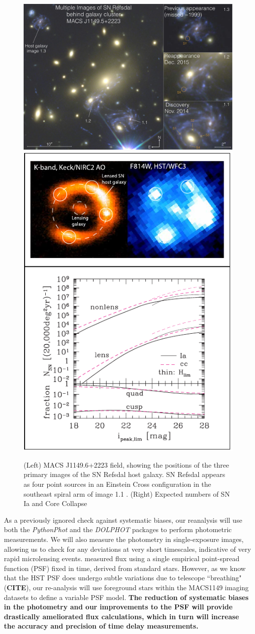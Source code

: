 \begin{figure}[h]
\centering
\includegraphics[width=.44\linewidth]{FIG/refsdal_rodney}
\includegraphics[width=.35\linewidth]{FIG/lensed2}
\caption{
(Left) MACS J1149.6+2223 field, showing the positions of the three primary
images of the SN Refsdal host galaxy. SN
Refsdal appears as four point sources in an Einstein Cross
configuration in the southeast spiral arm of image 1.1 \citep{Rodney:2016}. (Right)
Expected numbers of SN Ia and Core Collapse}
\end{figure}%

As a previously ignored check against systematic biases, our reanalysis will use both the \textit{PythonPhot} and the \textit{DOLPHOT} packages to 
perform photometric measurements. We will also measure the photometry in single-exposure images, allowing us to check for any deviations 
at very short timescales, indicative of very rapid microlensing events. \cite{Rodney:2016} measured flux using a single empirical 
point-spread function (PSF) fixed in time, derived from standard stars. However, as we know that the HST PSF does undergo 
subtle variations due to telescope ``breathing" (\textbf{CITE}), our re-analysis will use foreground stars within the MACS1149 imaging 
datasets to define a variable PSF model. \textbf{The reduction of systematic biases in the photometry and our improvements to the 
PSF will provide drastically ameliorated flux calculations, which in turn will increase the accuracy and precision of time delay measurements.}

